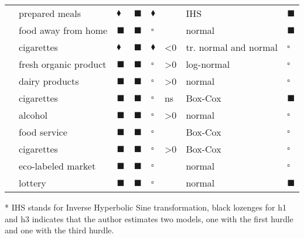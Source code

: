 \begin{table}
\begin{threeparttable}
\begin{center}
\begin{footnotesize}
\begin{tabular}{llllllll}
  \cite{NEWM:HENC:MATT:03} & prepared meals & $\blacklozenge$ & $\blacksquare$ & $\blacklozenge$ &  & IHS & $\blacksquare$ \\ 
  \cite{MUTL:GRAC:04} & food away from home & $\blacksquare$ & $\blacksquare$ & $\square$ &  & normal & $\blacksquare$ \\ 
  \cite{YEN:05} & cigarettes & $\blacklozenge$ & $\blacksquare$ & $\blacklozenge$ & <0 & tr. normal and normal & $\square$ \\ 
  \cite{ZHAN:HUAN:LIN:06} & fresh organic product & $\blacksquare$ & $\blacksquare$ & $\square$ & >0 & log-normal & $\square$ \\ 
  \cite{FULL:BEGH:ROZE:07} & dairy products & $\blacksquare$ & $\blacksquare$ & $\square$ & >0 & normal & $\square$ \\ 
  \cite{ARIS:PIER:08} & cigarettes & $\blacksquare$ & $\blacksquare$ & $\square$ & ns & Box-Cox & $\blacksquare$ \\ 
  \cite{ARIS:PERA:PIER:08} & alcohol & $\blacksquare$ & $\blacksquare$ & $\square$ & >0 & normal & $\square$ \\ 
  \cite{KEEL:HENCH:NEWM:09} & food service & $\blacksquare$ & $\blacksquare$ & $\square$ &  & Box-Cox & $\square$ \\ 
  \cite{ARIS:PIER:09} & cigarettes & $\blacksquare$ & $\blacksquare$ & $\square$ & >0 & Box-Cox & $\square$ \\ 
  \cite{BROU:KHAN:12} & eco-labeled market & $\blacksquare$ & $\blacksquare$ & $\square$ &  & normal & $\square$ \\ 
  \cite{CROW:EAKI:JORD:12} & lottery & $\blacksquare$ & $\blacksquare$ & $\square$ &  & normal & $\blacksquare$ \\ 
   \hline
\end{tabular}\begin{tablenotes}
  \item[*] IHS stands for Inverse Hyperbolic Sine transformation, black lozenges for h1 and h3 indicates that the
  author estimates two models, one with the first hurdle and one with
  the third hurdle.
\end{tablenotes}
\end{footnotesize}
\end{center}
\end{threeparttable}
\end{table}
